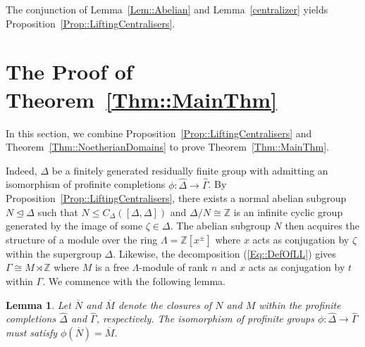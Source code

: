 \documentclass{amsart}
\numberwithin{theorem}{section}
\numberwithin{equation}{section}
\newtheorem{lemma}[theorem]{Lemma}
\newcommand{\Z}{\mathbb{Z}}
\newcommand{\hD}{\widehat{\Delta}}
\newcommand{\hG}{\widehat{\Gamma}}
\begin{document}
The conjunction of Lemma~\ref{Lem::Abelian} and Lemma~\ref{centralizer} yields Proposition~\ref{Prop::LiftingCentralisers}.

\section{The Proof of Theorem~\ref{Thm::MainThm}} \label{Sec::Final}

In this section, we combine Proposition~\ref{Prop::LiftingCentralisers} and Theorem~\ref{Thm::NoetherianDomains} to prove Theorem~\ref{Thm::MainThm}.

\MainThm*

Indeed, $\Delta$ be a finitely generated residually finite group with admitting an isomorphism of profinite completions $\phi \colon \hD \to \hG$. By Proposition~\ref{Prop::LiftingCentralisers}, there exists a normal abelian subgroup $N \trianglelefteq \Delta$ such that $N \leq C_\Delta([\Delta,\Delta])$ and $\Delta / N \cong \Z$ is an infinite cyclic group generated by the image of some $\zeta \in \Delta$. The abelian subgroup $N$ then acquires the structure of a module over the ring $\Lambda = \Z[x^\pm]$ where $x$ acts as conjugation by $\zeta$ within the supergroup $\Delta$. Likewise, the decomposition (\ref{Eq::DefOfLL}) gives $\Gamma \cong M \rtimes \Z$ where $M$ is a free $\Lambda$-module of rank $n$ and $x$ acts as conjugation by $t$ within $\Gamma$. We commence with the following lemma.
\begin{lemma}\label{Lem::ImageOfAbelianSubgroup}
    Let $\overline{N}$ and $\overline{M}$ denote the closures of $N$ and $M$ within the profinite completions $\hD$ and $\hG$, respectively. The isomorphism of profinite groups $\phi \colon \hD \to \hG$ must satisfy $\phi(\overline{N}) = \overline{M}$.
\end{lemma}
\end{document}
